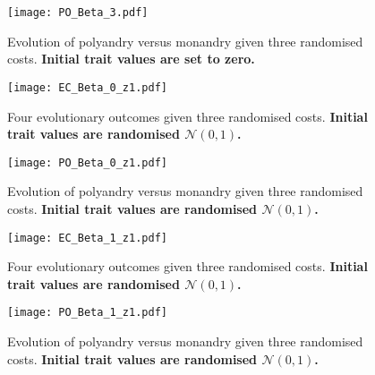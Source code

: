 \documentclass[12pt]{article}
\begin{document}
\begin{figure}
\begin{center}				
\texttt{[image: PO\_Beta\_3.pdf]}
\end{center}
\caption{Evolution of polyandry versus monandry given three randomised costs. \textbf{Initial trait values are set to zero.}}
\end{figure}

\clearpage


\begin{figure}
\begin{center}				
\texttt{[image: EC\_Beta\_0\_z1.pdf]}
\end{center}
\caption{Four evolutionary outcomes given three randomised costs. \textbf{Initial trait values are randomised $\mathcal{N}\left(0,1\right)$.}}
\end{figure}

\begin{figure}
\begin{center}				
\texttt{[image: PO\_Beta\_0\_z1.pdf]}
\end{center}
\caption{Evolution of polyandry versus monandry given three randomised costs. \textbf{Initial trait values are randomised $\mathcal{N}\left(0,1\right)$.}}
\end{figure}

\clearpage


\begin{figure}
\begin{center}				
\texttt{[image: EC\_Beta\_1\_z1.pdf]}
\end{center}
\caption{Four evolutionary outcomes given three randomised costs. \textbf{Initial trait values are randomised $\mathcal{N}\left(0,1\right)$.}}
\end{figure}

\begin{figure}
\begin{center}				
\texttt{[image: PO\_Beta\_1\_z1.pdf]}
\end{center}
\caption{Evolution of polyandry versus monandry given three randomised costs. \textbf{Initial trait values are randomised $\mathcal{N}\left(0,1\right)$.}}
\end{figure}
\end{document}
